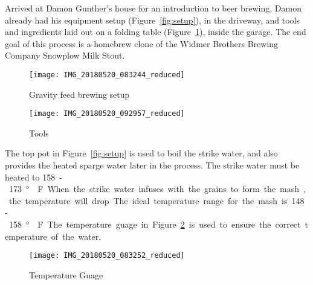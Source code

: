 \label{20180520}

\FloatBarrier{}

Arrived at Damon Gunther's house for an introduction to beer brewing.  Damon already had his equipment setup (Figure~\ref{fig:setup}), in the driveway, and tools and ingredients laid out on a folding table (Figure~\ref{fig:tools}), inside the garage.  The end goal of this process is a homebrew clone of the Widmer Brothers Brewing Company Snowplow Milk Stout.

\begin{figure}[H]
\begin{minipage}{0.48\textwidth}
  \centering
  \texttt{[image: IMG\_20180520\_083244\_reduced]}
  \caption{Gravity feed brewing setup}\label{fig:setup}
\end{minipage}\hfill
\begin{minipage}{0.48\textwidth}
  \centering
  \texttt{[image: IMG\_20180520\_092957\_reduced]}
  \caption{Tools}\label{fig:tools}
\end{minipage}
\end{figure}

\FloatBarrier{}
\clearpage
\FloatBarrier{}

The top pot in Figure~\ref{fig:setup} is used to boil the \gls{strike water}, and also provides the heated \gls{sparge water} later in the process.  The \gls{strike water} must be heated to \SI{158} - \SI{173}\degree{}F.  When the strike water infuses with the grains to form the mash, the temperature will drop.  The ideal temperature range for the mash is \SI{148} - \SI{158}\degree{}F.  The temperature guage in Figure~\ref{fig:temp} is used to ensure the correct temperature of the water.

\begin{figure}[H]
  \centering
  \texttt{[image: IMG\_20180520\_083252\_reduced]}
  \caption{Temperature Guage}\label{fig:temp}
\end{figure}

\FloatBarrier{}
\clearpage
\FloatBarrier{}

